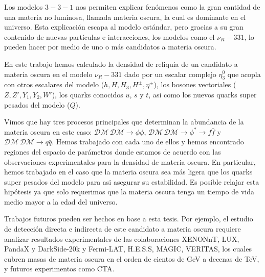 
Los modelos $3-3-1$ nos permiten explicar fenómenos como la gran cantidad de una materia no luminosa, llamada materia oscura, la cual es dominante en el universo. Esta explicación escapa al modelo estándar, pero gracias a su gran contenido de nuevas partículas e interacciones, los modelos como el $\nu_R-331$, lo pueden hacer por medio de uno o más candidatos a materia oscura.

En este trabajo hemos calculado la densidad de reliquia de un candidato a materia oscura en el modelo $\nu_R-331$ dado por un escalar complejo $\eta_3^0$ que acopla con otros escalares del modelo ($h,H,H_3,H^{\pm},\eta^{\pm}$), los bosones vectoriales ($Z,Z',Y_1,Y_2,W'$), los quarks conocidos $u$, $s$ y $t$, asi como los nuevos quarks super pesados del modelo ($Q$).

Vimos que hay tres procesos principales que determinan la abundancia de la materia oscura en este caso: $\mathcal{DM}\, \mathcal{DM} \to \phi \phi$, $\mathcal{DM}\, \mathcal{DM} \to \phi^* \to f\bar{f}$ y $\mathcal{DM}\, \mathcal{DM} \to q\bar{q}$. Hemos trabajado con cada uno de ellos y hemos encontrado regiones del espacio de parámetros donde estamos de acuerdo con las observaciones experimentales para la densidad de materia oscura. En particular, hemos trabajado en el caso que la materia oscura sea más ligera que los quarks super pesados del modelo para asi asegurar su estabilidad. Es posible relajar esta hipótesis ya que solo requerimos que la materia oscura tenga un tiempo de vida medio mayor a la edad del universo.

Trabajos futuros pueden ser hechos en base a esta tesis. Por ejemplo, el estudio de detección directa e indirecta de este candidato a materia oscura requiere analizar resultados experimentales de las colaboraciones XENONnT, LUX, PandaX y DarkSide-20k y Fermi-LAT, H.E.S.S, MAGIC, VERITAS, los cuales cubren masas de materia oscura en el orden de cientos de GeV a decenas de TeV, y futuros experimentos como CTA.

